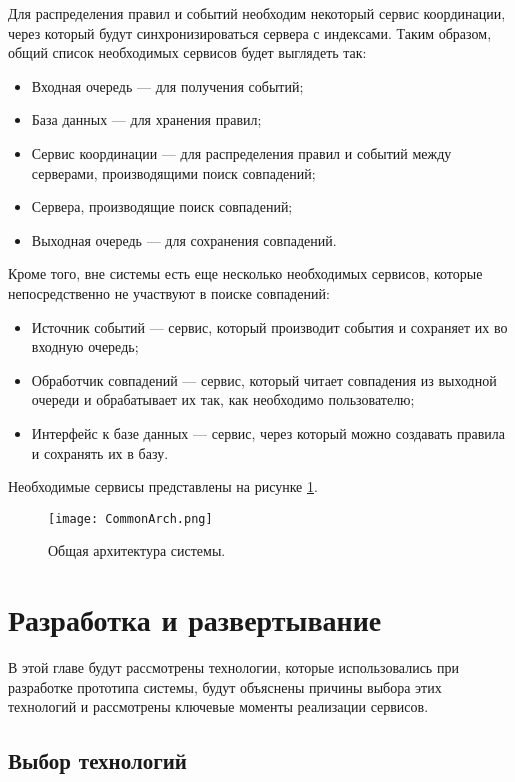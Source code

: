 \documentclass[14pt]{article}
\begin{document}
Для распределения правил и событий необходим некоторый сервис координации, через который будут синхронизироваться сервера с индексами. Таким образом, общий список необходимых сервисов будет выглядеть так:
\begin{itemize}
    \item Входная очередь --- для получения событий;
    \item База данных --- для хранения правил;
    \item Сервис координации --- для распределения правил и событий между серверами, производящими поиск совпадений;
    \item Сервера, производящие поиск совпадений;
    \item Выходная очередь --- для сохранения совпадений.
\end{itemize}
Кроме того, вне системы есть еще несколько необходимых сервисов, которые непосредственно не участвуют в поиске совпадений:
\begin{itemize}
    \item Источник событий --- сервис, который производит события и сохраняет их во входную очередь;
    \item Обработчик совпадений --- сервис, который читает совпадения из выходной очереди и обрабатывает их так, как необходимо пользователю;
    \item Интерфейс к базе данных --- сервис, через который можно создавать правила и сохранять их в базу.
\end{itemize}
Необходимые сервисы представлены на рисунке \ref{fig:commonArch}.

\begin{figure}[h]
  \centering
    \texttt{[image: CommonArch.png]}
    \caption{Общая архитектура системы.}
    \label{fig:commonArch}
\end{figure}

\section{Разработка и развертывание}
В этой главе будут рассмотрены технологии, которые использовались при разработке прототипа системы, будут объяснены причины выбора этих технологий и рассмотрены ключевые моменты реализации сервисов.

\subsection{Выбор технологий}
\end{document}
